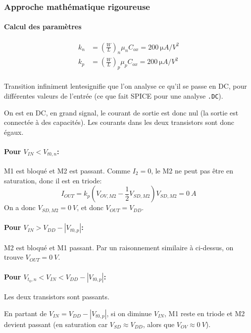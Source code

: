\documentclass[frenchb,DIV=14]{scrartcl}
\begin{document}
\subsubsection*{Approche mathématique rigoureuse}
\paragraph{Calcul des paramètres}
\begin{align*}
    k_n &= \left(\frac{W}{L}\right)_n \mu_n C_{ox} = \SI{200}{\micro A/V^2} \\
    k_p &= \left(\frac{W}{L}\right)_p \mu_p C_{ox} = \SI{200}{\micro A/V^2} \\
\end{align*}

\og Transition infiniment lente\fg signifie que l'on analyse ce qu'il se passe
en DC, pour différentes valeurs de l'entrée (ce que fait SPICE pour une analyse
\texttt{.DC}).

On est en DC, en grand signal, le courant de sortie est donc nul (la sortie est
connectée à des capacités). Les courants dans les deux transistors sont donc
égaux.

\paragraph{Pour $V_{IN} < V_{t0,n}$:}
M1 est bloqué et M2 est passant.
Comme $I_{2} = 0$, le M2 ne peut pas être en saturation,
donc il est en triode:
\[I_{OUT} = k_p \left(V_{OV,M2} - \frac{1}{2} V_{SD,M2}\right)V_{SD,M2} = \SI{0}{A}\]
On a donc $V_{SD,M2} = \SI{0}{V}$, et donc $V_{OUT} = V_{DD}$.

\paragraph{Pour $V_{IN} > V_{DD} - \left|V_{t0,p}\right|$:}
M2 est bloqué et M1 passant. Par un raisonnement similaire à ci-dessus,
on trouve $V_{OUT} = \SI{0}{V}$.

\paragraph{Pour $V_{t_0,n} < V_{IN} < V_{DD} - \left|V_{t0,p}\right|$:}
Les deux transistors sont passants.

En partant de $V_{IN} = V_{DD} - \left|V_{t0,p}\right|$,
si on diminue $V_{IN}$, M1 reste en triode et M2 devient passant
(en saturation car $V_{SD} \approx V_{DD}$, alors que $V_{OV} \approx \SI{0}{V}$).
\end{document}

